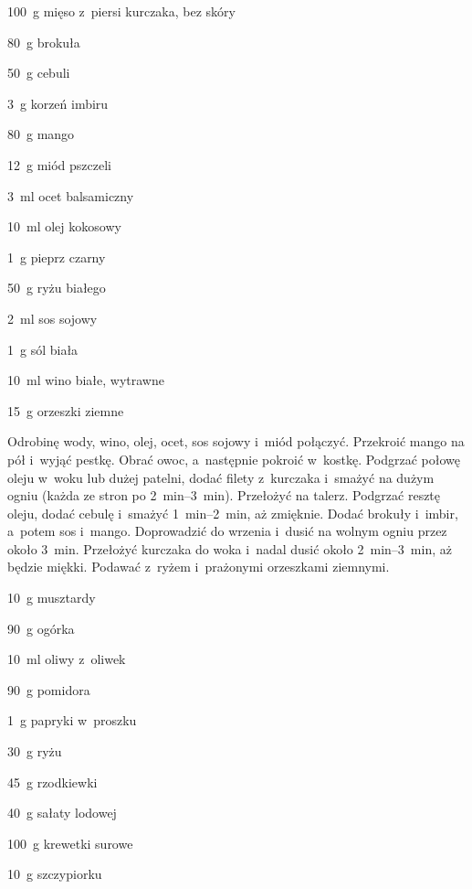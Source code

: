 \documentclass[../main.tex]{subfiles}
\begin{document}
\begin{Ingred}
    \item \qty{100}{\gram} mięso z~piersi kurczaka, bez skóry
    \item \qty{80}{\gram} brokuła
    \item \qty{50}{\gram} cebuli
    \item \qty{3}{\gram} korzeń imbiru
    \item \qty{80}{\gram} mango
    \item \qty{12}{\gram} miód pszczeli
    \item \qty{3}{\milli\litre} ocet balsamiczny
    \item \qty{10}{\milli\litre} olej kokosowy
    \item \qty{1}{\gram} pieprz czarny
    \item \qty{50}{\gram} ryżu białego
    \item \qty{2}{\milli\litre} sos sojowy
    \item \qty{1}{\gram} sól biała
    \item \qty{10}{\milli\litre} wino białe, wytrawne
    \item \qty{15}{\gram} orzeszki ziemne
\end{Ingred}

Odrobinę wody, wino, olej, ocet, sos sojowy i~miód połączyć. Przekroić mango na
pół i~wyjąć pestkę. Obrać owoc, a~następnie pokroić w~kostkę. Podgrzać połowę
oleju w~woku lub dużej patelni, dodać filety z~kurczaka i~smażyć na dużym ogniu
(każda ze stron po \qtyrange{2}{3}{\minute}). Przełożyć na talerz. Podgrzać
resztę oleju, dodać cebulę i~smażyć \qtyrange{1}{2}{\minute}, aż zmięknie.
Dodać brokuły i~imbir, a~potem sos i~mango. Doprowadzić do wrzenia i~dusić na
wolnym ogniu przez około \qty{3}{\minute}. Przełożyć kurczaka do woka i~nadal
dusić około \qtyrange{2}{3}{\minute}, aż będzie miękki. Podawać z~ryżem
i~prażonymi orzeszkami ziemnymi.


\begin{Ingred}
    \item \qty{10}{\gram} musztardy
    \item \qty{90}{\gram} ogórka
    \item \qty{10}{\milli\litre} oliwy z~oliwek
    \item \qty{90}{\gram} pomidora
    \item \qty{1}{\gram} papryki w~proszku
    \item \qty{30}{\gram} ryżu
    \item \qty{45}{\gram} rzodkiewki
    \item \qty{40}{\gram} sałaty lodowej
    \item \qty{100}{\gram} krewetki surowe
    \item \qty{10}{\gram} szczypiorku
\end{Ingred}
\end{document}
